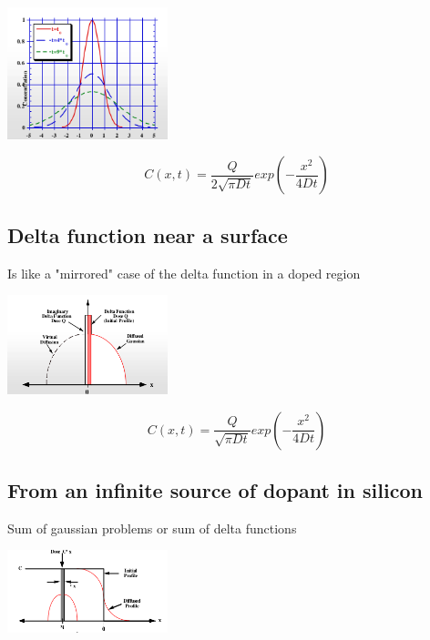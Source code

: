\centering
\includegraphics[width=0.35\textwidth]{delta_in.png}\\
\raggedright

\begin{equation}
C(x,t)=\frac{Q}{2\sqrt{\pi Dt}}exp\left(-\frac{x^2}{4Dt} \right)
\end{equation}


\subsection{Delta function near a surface}
Is like a "mirrored" case of the delta function in a doped region

\centering
\includegraphics[width=0.35\textwidth]{delta_surf.png}\\
\raggedright

\begin{equation}
C(x,t)=\frac{Q}{\sqrt{\pi Dt}}exp\left(-\frac{x^2}{4Dt} \right)
\end{equation}

\subsection{From an infinite source of dopant in silicon}
Sum of gaussian problems or sum of delta functions 

\centering
\includegraphics[width=0.35\textwidth]{inf_dop.png}\\
\raggedright

